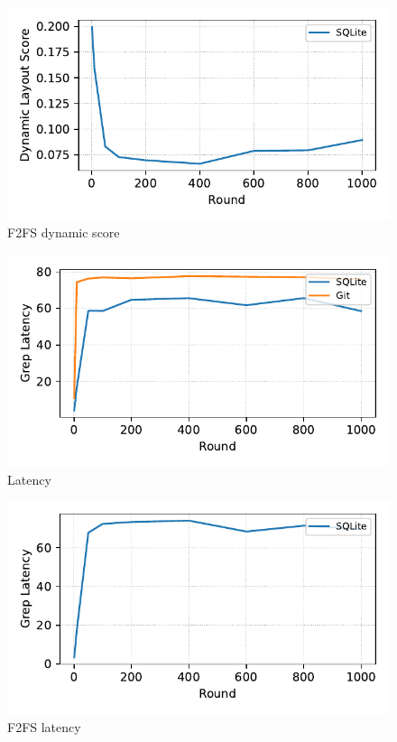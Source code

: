 \begin{figure}[t]
    \centering
    \includegraphics[width=0.95\columnwidth]{graphs/dynamic-f2fs}
    \caption{F2FS dynamic score}
    \label{fig:f2fs_dynamic_score}
\end{figure}


\begin{figure}[t]
    \centering
    \includegraphics[width=0.95\columnwidth]{graphs/latency}
    \caption{Latency}
    \label{fig:latency}
\end{figure}

\begin{figure}[t]
    \centering
    \includegraphics[width=0.95\columnwidth]{graphs/latency-f2fs}
    \caption{F2FS latency}
    \label{fig:f2fs_latency}
\end{figure}
